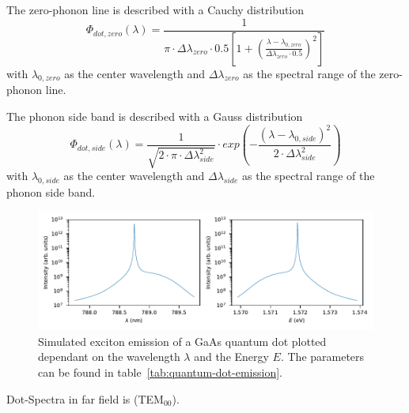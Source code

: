 The zero-phonon line is described with a Cauchy distribution
\begin{equation}
\Phi_{dot,zero}(\lambda) = \frac{1}{\pi \cdot \Delta\lambda_{zero} \cdot 0.5 \left[1+\left(\frac{\lambda - \lambda_{0, zero}}{\Delta\lambda_{zero} \cdot 0.5}\right)^2\right]}
\end{equation}
with $\lambda_{0, zero}$ as the center wavelength and $\Delta\lambda_{zero}$ as the spectral range of the zero-phonon line.

The phonon side band is described with a Gauss distribution
\begin{equation}
\Phi_{dot,side}(\lambda) = \frac{1}{\sqrt{2\cdot\pi\cdot \Delta\lambda_{side}^2}}\cdot exp\left(-\frac{(\lambda - \lambda_{0, side})^2}{2\cdot \Delta\lambda_{side}^2}\right)
\end{equation}
with $\lambda_{0, side}$ as the center wavelength and $\Delta\lambda_{side}$ as the spectral range of the phonon side band.

\begin{figure}[H]
	\centering
	\includegraphics{figures/fabry-perot/plots/quantum_dot_emission_wavelength_energy}
	\caption[Simulated exciton emission of a GaAs quantum dot]{Simulated exciton emission of a GaAs quantum dot plotted dependant on the wavelength $\lambda$ and the Energy $E$.
		The parameters can be found in table~\ref{tab:quantum-dot-emission}.}
	\label{fig:quantumdotemissionwavelengthenergy}
\end{figure}


Dot-Spectra in far field is (TEM$_{00}$).



